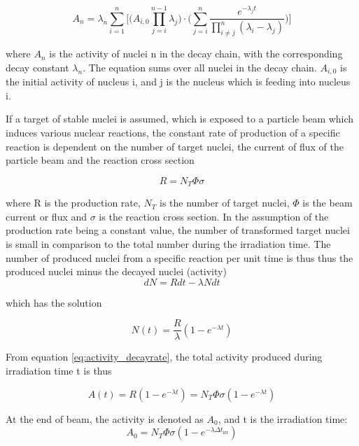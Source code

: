 \begin{equation} \label{eq:ndecay_chains}
    A_n = \lambda_n \sum_{i=1}^n \Big[ \Big( A_{i,0}\prod^{n-1}_{j=i}\lambda_j \Big)\cdot \Big( \sum_{j=i}^n \frac{e^{-\lambda_j t}}{\prod_{i\neq j}^n (\lambda_i - \lambda_j)} \Big) \Big]
\end{equation}

where $A_n$ is the activity of nuclei n in the decay chain, with the corresponding decay constant $\lambda_n$. The equation sums over all nuclei in the decay chain. $A_{i,0}$ is the initial activity of nucleus i, and j is the nucleus which is feeding into nucleus i. 

\noindent 
If a target of stable nuclei is assumed, which is exposed to a particle beam which induces various nuclear reactions, the constant rate of production of a specific reaction is dependent on the number of target nuclei, the current of flux of the particle beam and the reaction cross section

\begin{equation}
    R = N_T \Phi \sigma
\end{equation}

\noindent 
where R is the production rate, $N_T$ is the number of target nuclei, $\Phi$ is the beam current or flux and $\sigma$ is the reaction cross section. In the assumption of the production rate being a constant value, the number of transformed target nuclei is small in comparison to the total number during the irradiation time. The number of produced nuclei from a specific reaction per unit time is thus thus the produced nuclei minus the decayed nuclei (activity)
\begin{equation}
    dN = Rdt - \lambda N dt
\end{equation}

which has the solution

\begin{equation}
    N(t) = \frac{R}{\lambda}(1-e^{-\lambda t})
\end{equation}

From equation \ref{eq:activity_decayrate}, the total activity produced during irradiation time t is thus 

\begin{equation} 
    A(t) = R(1-e^{-\lambda t}) = N_T \Phi \sigma (1-e^{-\lambda t})
\end{equation}

At the end of beam, the activity is denoted as $A_0$, and t is the irradiation time:
\begin{equation} \label{eq:activity_eob}
    A_0 = N_T \Phi \sigma (1-e^{-\lambda \Delta t_\text{irr}})
\end{equation}

